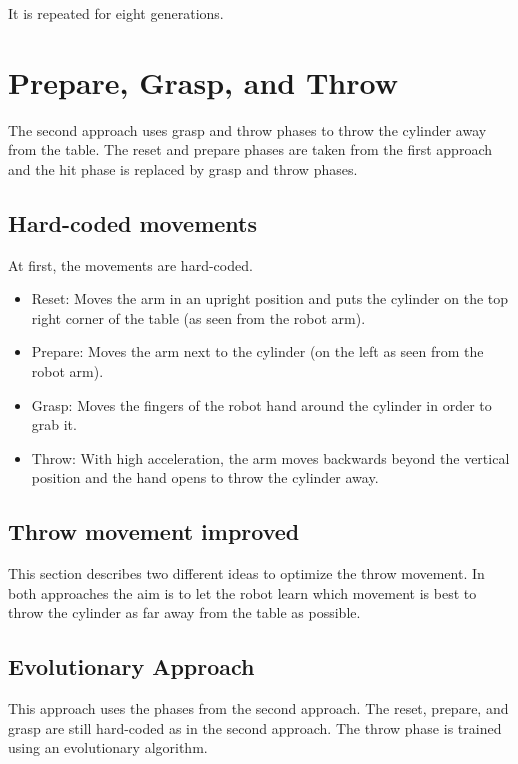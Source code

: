 \documentclass[10pt,twocolumn,letterpaper]{article}
\begin{document}
It is repeated for eight generations. 


\section{Prepare, Grasp, and Throw} \label{sec:Throw}

The second approach uses grasp and throw phases to throw the cylinder away from the table. The reset and prepare phases are taken from the first approach and the hit phase is replaced by grasp and throw phases.

\subsection{Hard-coded movements}

At first, the movements are hard-coded.

\begin{itemize}
\item Reset: Moves the arm in an upright position and puts the cylinder on the top right corner of the table (as seen from the robot arm).
\item Prepare: Moves the arm next to the cylinder (on the left as seen from the robot arm).
\item Grasp: Moves the fingers of the robot hand around the cylinder in order to grab it.
\item Throw: With high acceleration, the arm moves backwards beyond the vertical position and the hand opens to throw the cylinder away.
\end{itemize}


\subsection{Throw movement improved} 

This section describes two different ideas to optimize the throw movement. In both approaches the aim is to let the robot learn which movement is best to throw the cylinder as far away from the table as possible.

\subsection{Evolutionary Approach} \label{subsec:EA}

This approach uses the phases from the second approach. The reset, prepare, and grasp are still hard-coded as in the second approach. The throw phase is trained using an evolutionary algorithm. 
\end{document}
